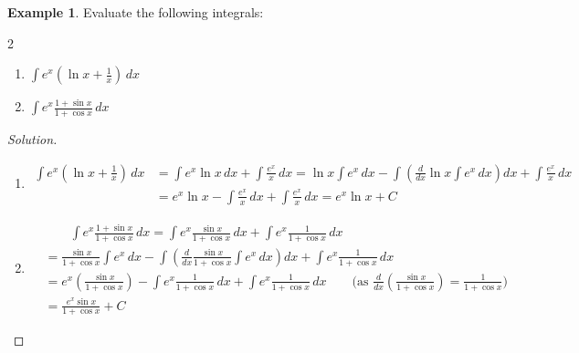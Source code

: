 \documentclass{book}
\theoremstyle{definition}
\newtheorem{example}{Example}[section]
\newenvironment{solution}
    {\begin{proof}[Solution]}
    {\end{proof}}
\begin{document}
\begin{example}
Evaluate the following integrals:
\begin{multicols}{2}

\begin{enumerate}[label=(\roman*)]
    \item $\displaystyle\int e^x(\ln x+\frac{1}{x})\,dx$
    \item $\displaystyle\int e^x\frac{1+\sin x}{1+\cos x}\,dx$
   
\end{enumerate}
\end{multicols}    
\end{example}

\begin{solution}
\begin{enumerate}[label=(\roman*)]
\item 
\begin{align*}
    \int e^x(\ln x+\frac{1}{x})\,dx &= \int e^x\ln x\,dx+\int \frac{e^x}{x}\,dx=\ln x\int e^x\,dx-\int \left(\frac{d}{dx}\ln x\int e^x\,dx\right)dx+\int \frac{e^x}{x}\,dx \\ 
    &= e^x\ln x-\int \frac{e^x}{x}\,dx+\int \frac{e^x}{x}\,dx = e^x\ln x+C
\end{align*}

\item 
\begin{align*}
   &\qquad \int e^x\frac{1+\sin x}{1+\cos x}\,dx = \int e^x\frac{\sin x}{1+\cos x}\,dx+\int e^x\frac{1}{1+\cos x}\,dx \\
&=\frac{\sin x}{1+\cos x}\int e^x\,dx-\int\left(\frac{d}{dx}\frac{\sin x}{1+\cos x}\int e^x\,dx\right)dx+\int e^x\frac{1}{1+\cos x}\,dx \\
&= e^x\left(\frac{\sin x}{1+\cos x}\right)-\int e^x\frac{1}{1+\cos x}\,dx+\int e^x\frac{1}{1+\cos x}\,dx \qquad \text{(as $\frac{d}{dx}(\frac{\sin x}{1+\cos x})=\frac{1}{1+\cos x}$)} \\
&= \frac{e^x\sin x}{1+\cos x}+C 
\end{align*}

\end{enumerate} 
\end{solution}
\end{document}
